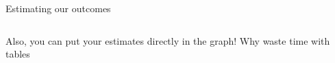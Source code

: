 \documentclass[notes,11pt, aspectratio=169]{beamer}
\newenvironment{wideitemize}{\itemize\addtolength{\itemsep}{10pt}}{\enditemize}
\begin{document}
\begin{frame}{Estimating our outcomes}
    \begin{columns}[onlytextwidth, T] %
      \begin{column}{.5\textwidth}
        \begin{wideitemize}
        \item Also, you can put your estimates directly in the graph! Why waste time with tables
        \end{wideitemize}
      \end{column}%
      \hfill%
      \begin{column}{.5\textwidth}
      \end{column}%
    \end{columns}
\end{frame}
\end{document}
